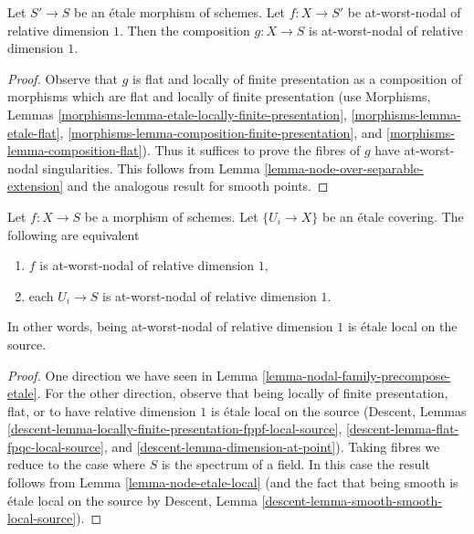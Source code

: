 \begin{lemma}
\label{lemma-nodal-family-postcompose-etale}
Let $S' \to S$ be an \'etale morphism of schemes.
Let $f : X \to S'$ be at-worst-nodal of relative dimension $1$.
Then the composition $g : X \to S$
is at-worst-nodal of relative dimension $1$.
\end{lemma}

\begin{proof}
Observe that $g$ is flat and locally of finite presentation as
a composition of morphisms which are flat and locally of finite
presentation (use
Morphisms, Lemmas \ref{morphisms-lemma-etale-locally-finite-presentation},
\ref{morphisms-lemma-etale-flat},
\ref{morphisms-lemma-composition-finite-presentation}, and
\ref{morphisms-lemma-composition-flat}).
Thus it suffices to prove the fibres of $g$
have at-worst-nodal singularities.
This follows from Lemma \ref{lemma-node-over-separable-extension}
and the analogous result for smooth points.
\end{proof}

\begin{lemma}
\label{lemma-nodal-family-etale-local-source}
Let $f : X \to S$ be a morphism of schemes. Let $\{U_i \to X\}$
be an \'etale covering. The following are equivalent
\begin{enumerate}
\item $f$ is at-worst-nodal of relative dimension $1$,
\item each $U_i \to S$ is at-worst-nodal of relative dimension $1$.
\end{enumerate}
In other words, being at-worst-nodal of relative dimension $1$
is \'etale local on the source.
\end{lemma}

\begin{proof}
One direction we have seen in Lemma \ref{lemma-nodal-family-precompose-etale}.
For the other direction, observe that being locally of finite
presentation, flat, or to have relative dimension $1$
is \'etale local on the source
(Descent, Lemmas
\ref{descent-lemma-locally-finite-presentation-fppf-local-source},
\ref{descent-lemma-flat-fpqc-local-source}, and
\ref{descent-lemma-dimension-at-point}). Taking fibres we reduce
to the case where $S$ is the spectrum of a field. In this case the
result follows from Lemma \ref{lemma-node-etale-local}
(and the fact that being smooth is \'etale local on the source by
Descent, Lemma \ref{descent-lemma-smooth-smooth-local-source}).
\end{proof}

